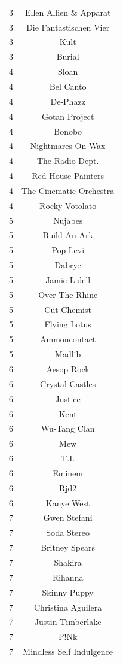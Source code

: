 \documentclass[conference]{IEEEtran}
\begin{document}
\begin{table}[]
\begin{tabular}{|c|c|}
3 & Ellen Allien \& Apparat \\ 
3 & Die Fantastischen Vier \\ 
3 & Kult \\ 
3 & Burial \\  \hline
4 & Sloan \\ 
4 & Bel Canto \\ 
4 & De-Phazz \\ 
4 & Gotan Project \\ 
4 & Bonobo \\ 
4 & Nightmares On Wax \\ 
4 & The Radio Dept. \\ 
4 & Red House Painters \\ 
4 & The Cinematic Orchestra \\ 
4 & Rocky Votolato \\  \hline
5 & Nujabes \\ 
5 & Build An Ark \\ 
5 & Pop Levi \\ 
5 & Dabrye \\ 
5 & Jamie Lidell \\ 
5 & Over The Rhine \\ 
5 & Cut Chemist \\ 
5 & Flying Lotus \\ 
5 & Ammoncontact \\ 
5 & Madlib \\  \hline
6 & Aesop Rock \\ 
6 & Crystal Castles \\ 
6 & Justice \\ 
6 & Kent \\ 
6 & Wu-Tang Clan \\ 
6 & Mew \\ 
6 & T.I. \\ 
6 & Eminem \\ 
6 & Rjd2 \\ 
6 & Kanye West \\  \hline
7 & Gwen Stefani \\ 
7 & Soda Stereo \\ 
7 & Britney Spears \\ 
7 & Shakira \\ 
7 & Rihanna \\ 
7 & Skinny Puppy \\ 
7 & Christina Aguilera \\ 
7 & Justin Timberlake \\ 
7 & P!Nk \\ 
7 & Mindless Self Indulgence \\ \hline
\end{tabular}
\end{table}
\end{document}
